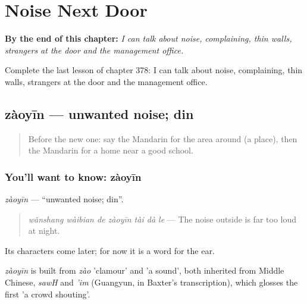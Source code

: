 
\chapter{Noise Next Door}
\label{ch:zh-noise-next-door}

\begin{chapteropening}
\textbf{By the end of this chapter:} \emph{I can talk about noise, complaining, thin walls, strangers at the door and the management office.}

Complete the last lesson of chapter 378: I can talk about noise, complaining, thin walls, strangers at the door and the management office.
\end{chapteropening}

\section[zàoyīn]{zàoyīn — unwanted noise; din}

\label{lesson:ZH-C378-zaoyin}



\begin{quote}
Before the new one: say the Mandarin for the area around (a place), then the Mandarin for a home near a good school.
\end{quote}

\subsection*{You'll want to know: zàoyīn}
\emph{zàoyīn} — \textquotedblleft{}unwanted noise; din\textquotedblright{}.

\begin{quote}
\emph{wǎnshang wàibian de zàoyīn tài dà le} — The noise outside is far too loud at night.
\end{quote}

Its characters come later; for now it is a word for the ear.

\begin{cousinweb}
\emph{zàoyīn} is built from \emph{zào} 'clamour' and  'a sound', both inherited from Middle Chinese, \emph{sawH} and \emph{'im} (Guangyun, in Baxter's transcription), which glosses the first 'a crowd shouting'.
\end{cousinweb}

